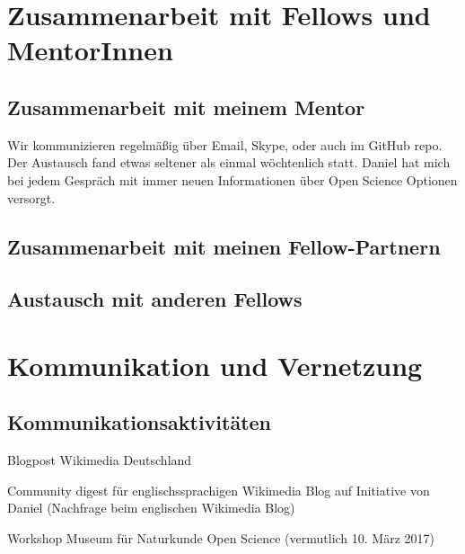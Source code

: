 \documentclass[11pt,a4paper]{article}
\begin{document}
\section{Zusammenarbeit mit Fellows und MentorInnen}%
\subsection{Zusammenarbeit mit meinem Mentor}%
Wir kommunizieren regelmäßig über Email, Skype, oder auch im GitHub repo. Der Austausch fand etwas seltener als einmal wöchtenlich statt. Daniel hat mich bei jedem Gespräch mit immer neuen Informationen über Open Science Optionen versorgt. 


\subsection{Zusammenarbeit mit meinen Fellow-Partnern}%


\subsection{Austausch mit anderen Fellows}%



\section{Kommunikation und Vernetzung}%
\subsection{Kommunikationsaktivitäten}%

\begin{compactitem}
\item Blogpost Wikimedia Deutschland
\item Community digest für englischssprachigen Wikimedia Blog auf Initiative von Daniel (Nachfrage beim englischen Wikimedia Blog)
\item Workshop Museum für Naturkunde Open Science (vermutlich 10. März 2017)
\end{compactitem}
\end{document}
